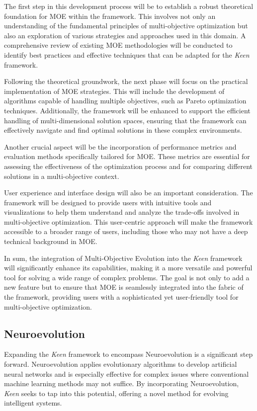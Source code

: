         The first step in this development process will be to establish a robust theoretical foundation for MOE within 
        the framework. This involves not only an understanding of the fundamental principles of multi-objective 
        optimization but also an exploration of various strategies and approaches used in this domain. A comprehensive 
        review of existing MOE methodologies will be conducted to identify best practices and effective techniques that 
        can be adapted for the \textit{Keen} framework.

        Following the theoretical groundwork, the next phase will focus on the practical implementation of MOE 
        strategies. This will include the development of algorithms capable of handling multiple objectives, such as 
        Pareto optimization techniques. Additionally, the framework will be enhanced to support the efficient handling 
        of multi-dimensional solution spaces, ensuring that the framework can effectively navigate and find optimal 
        solutions in these complex environments.

        Another crucial aspect will be the incorporation of performance metrics and evaluation methods specifically 
        tailored for MOE. These metrics are essential for assessing the effectiveness of the optimization process and 
        for comparing different solutions in a multi-objective context.

        User experience and interface design will also be an important consideration. The framework will be designed to 
        provide users with intuitive tools and visualizations to help them understand and analyze the trade-offs 
        involved in multi-objective optimization. This user-centric approach will make the framework accessible to a 
        broader range of users, including those who may not have a deep technical background in MOE.

        In sum, the integration of Multi-Objective Evolution into the \textit{Keen} framework will significantly enhance 
        its capabilities, making it a more versatile and powerful tool for solving a wide range of complex problems. The 
        goal is not only to add a new feature but to ensure that MOE is seamlessly integrated into the fabric of the 
        framework, providing users with a sophisticated yet user-friendly tool for multi-objective optimization.

    \subsection{Neuroevolution}
    \label{sec:future:ne}
        Expanding the \textit{Keen} framework to encompass Neuroevolution is a significant step forward. Neuroevolution 
        applies evolutionary algorithms to develop artificial neural networks and is especially effective for complex 
        issues where conventional machine learning methods may not suffice. By incorporating Neuroevolution, 
        \textit{Keen} seeks to tap into this potential, offering a novel method for evolving intelligent systems.

